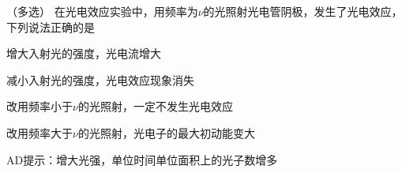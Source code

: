 （多选）
在光电效应实验中，用频率为\(\nu\)的光照射光电管阴极，发生了光电效应，下列说法正确的是\paren[AD]
\begin{choices}
	\item 增大入射光的强度，光电流增大
	\item 减小入射光的强度，光电效应现象消失
	\item 改用频率小于\(\nu\)的光照射，一定不发生光电效应
	\item 改用频率大于\(\nu\)的光照射，光电子的最大初动能变大
\end{choices}
\begin{answer}
	AD\qquad 提示：增大光强，单位时间单位面积上的光子数增多
\end{answer}